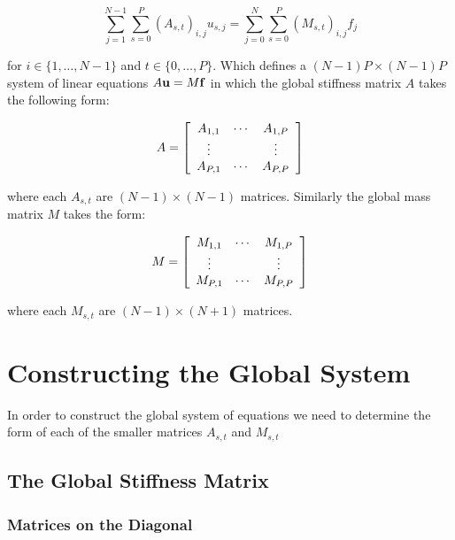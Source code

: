 \begin{equation}
    \sum_{j=1}^{N - 1}\sum_{s=0}^P(A_{s,t})_{i,j}u_{s,j} =
    \sum_{j=0}^N\sum_{s=0}^P(M_{s,t})_{i,j}f_j
\end{equation}

for $i \in \{1,\ldots,N - 1\}$ and $t \in \{0,\ldots,P\}$. Which defines a
$(N - 1)P \times (N - 1)P$ system of linear equations $A\mathbf{u} = M\mathbf{f}$ in
which the global stiffness matrix $A$ takes the following form:

\begin{equation}
    A = \left[\begin{array}{c c c}
            A_{1,1} & \cdots & A_{1,P} \\
            \vdots & & \vdots \\
            A_{P,1} & \cdots & A_{P,P}
        \end{array}\right]
\end{equation}

where each $A_{s,t}$ are $(N - 1) \times (N - 1)$ matrices. Similarly the
global mass matrix $M$ takes the form:

\begin{equation}
    M = \left[\begin{array}{c c c}
            M_{1,1} & \cdots & M_{1,P} \\
            \vdots & & \vdots \\
            M_{P,1} & \cdots & M_{P,P}
        \end{array}\right]
\end{equation}

where each $M_{s,t}$ are $(N - 1) \times (N + 1) $ matrices.

\section{Constructing the Global System}

In order to construct the global system of equations we need to determine the
form of each of the smaller matrices $A_{s,t}$ and $M_{s,t}$

\subsection{The Global Stiffness Matrix}

\subsubsection{Matrices on the Diagonal}

